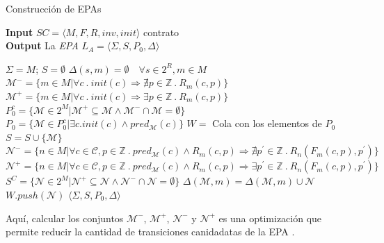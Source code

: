 \begin{algorithm}[H]
    \caption{Construcción de EPAs}
    \hspace*{\algorithmicindent} \textbf{Input} $SC = \langle M, F, R, inv, init \rangle$ contrato \\
    \hspace*{\algorithmicindent} \textbf{Output} La \textit{EPA} $L_A =\langle \Sigma, S, P_0, \Delta \rangle$
    \begin{algorithmic}[1]
        \State $\Sigma = M$; $S = \emptyset$
        \State $\Delta(s,m) = \emptyset \quad \forall s \in 2^R, m \in M$
        \State $\mathcal{M}^- = \{m \in M | \forall c \: . \: init(c) \Rightarrow \nexists p \in \mathds{Z} \: . \: R_m(c,p)\}$
        \State $\mathcal{M}^+ = \{m \in M | \forall c \: . \: init(c) \Rightarrow \exists p \in \mathds{Z} \: . \: R_m(c,p)\}$
        \State $P_0^c = \{\mathcal{M} \in 2^M | \mathcal{M}^+ \subseteq \mathcal{M} \land \mathcal{M}^- \cap \mathcal{M} = \emptyset \}$
        \State $P_0 = \{\mathcal{M} \in P_0^c | \exists c . init(c) \land pred_\mathcal{M}(c) \}$
        \State $W =$ Cola con los elementos de $P_0$
        \State $S = S \cup \{\mathcal{M}\}$
        \State $\mathcal{N}^- = \{n \in M | \forall c \in \mathcal{C}, p \in \mathds{Z} \: . \: pred_\mathcal{M}(c) \land R_m(c,p) \Rightarrow \nexists p^\prime \in \mathds{Z} \: . \: R_n(F_m(c,p),p^\prime)\}$
        \State $\mathcal{N}^+ = \{n \in M | \forall c \in \mathcal{C}, p \in \mathds{Z} \: . \: pred_\mathcal{M}(c) \land R_m(c,p) \Rightarrow \exists p^\prime \in \mathds{Z} \: . \: R_n(F_m(c,p),p^\prime)\}$
        \State $S^C = \{\mathcal{N} \in 2^M | \mathcal{N}^+ \subseteq \mathcal{N} \land \mathcal{N}^- \cap \mathcal{N} = \emptyset\}$
            \State $\Delta (\mathcal{M},m) = \Delta (\mathcal{M},m) \cup \mathcal{N}$
            \State $W.push(\mathcal{N})$
            \EndIf
            \EndIf
            \EndFor
            \EndFor
            \EndWhile
            \State \Return $\langle \Sigma, S, P_0, \Delta \rangle$
    \end{algorithmic}
\end{algorithm}

Aquí, calcular los conjuntos $\mathcal{M}^-$, $\mathcal{M}^+$, $\mathcal{N}^-$ y $\mathcal{N}^+$ es una optimización que permite reducir la cantidad de transiciones canidadatas de la EPA \cite{de-caso-epa}.

